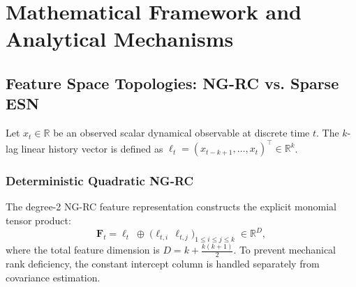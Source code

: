 \documentclass[aip,cha,reprint,amsmath,amssymb]{revtex4-2}
\begin{document}
\section{Mathematical Framework and Analytical Mechanisms}
\label{sec:math}

\subsection{Feature Space Topologies: NG-RC vs. Sparse ESN}

Let $x_t \in \mathbb{R}$ be an observed scalar dynamical observable at discrete time $t$. The $k$-lag linear history vector is defined as $\bm{\ell}_t = (x_{t-k+1}, \dots, x_t)^\top \in \mathbb{R}^k$.

\subsubsection{Deterministic Quadratic NG-RC}
The degree-2 NG-RC feature representation constructs the explicit monomial tensor product:
\begin{equation}
\mathbf{F}_t = \bm{\ell}_t \;\oplus\; \Big( \ell_{t,i} \, \ell_{t,j} \Big)_{1 \le i \le j \le k} \;\in \mathbb{R}^D,
\label{eq:ngrc_state}
\end{equation}
where the total feature dimension is $D = k + \frac{k(k+1)}{2}$. To prevent mechanical rank deficiency, the constant intercept column is handled separately from covariance estimation.
\end{document}
